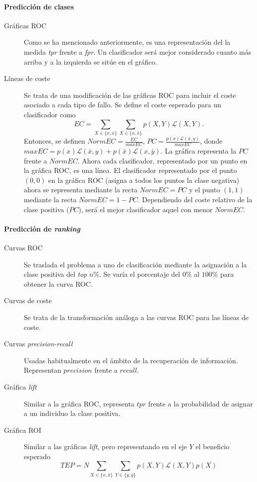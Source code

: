 \paragraph{Predicción de clases}
	\begin{description}
		\item[Gráficas ROC] Como se ha mencionado anteriormente, es una representación del la medida \textit{tpr} frente a \textit{fpr}. Un clasificador será mejor considerado cuanto más arriba y a la izquierda se sitúe en el gráfico. 
		\item[Líneas de coste] Se trata de una modificación de las gráficas ROC para incluir el coste asociado a cada tipo de fallo. Se define el coste esperado para un clasificador como 
		\[ EC = \sum\limits_{X \in \{x, \bar{x}\}} 
		 		\sum\limits_{X \in \{x, \bar{x}\}} 
		 			p(X,Y) \mathcal{L}(X,Y)			.\]
	Entonces, se definen $NormEC = \frac{EC}{maxEC}$, $PC = \frac{p(x) \mathcal{L}(\bar{x},y)}{maxEC}$, donde $maxEC = p(x)\mathcal{L}(\bar{x},y)+p(\bar{x})\mathcal{L}(x,\bar{y})$.  La gráfica representa la $PC$ frente a $NormEC$. Ahora cada clasificador, representado por un punto en la gráfica ROC, es una línea. El clasificador representado por el punto $(0,0)$ en la gráfica ROC (asigna a todos los puntos la clase negativa) ahora se representa mediante la recta $NormEC=PC$ y el punto $(1,1)$ mediante la recta $NormEC= 1-PC$. Dependiendo del coste relativo de la clase positiva ($PC$), será el mejor clasificador aquel con menor $NormEC$.
	\end{description}

\paragraph{Predicción de \textit{ranking}} 	
	\begin{description}
		\item[Curvas ROC] Se traslada el problema a uno de clasificación mediante la asignación a la clase positiva del \textit{top} $n\%$. Se varía el porcentaje del $0\%$ al $100\%$ para obtener la curva ROC.
		\item[Curvas de coste] Se trata de la transformación análoga a las curvas ROC para las líneas de coste.
		\item[Curvas \textit{precision-recall}] Usadas habitualmente en el ámbito de la recuperación de información. Representan $precision$ frente a $recall$.
		\item[Gráfica \textit{lift}] Similar a la gráfica ROC, representa $tpr$ frente a la probabilidad de asignar a un individuo la clase positiva. 
		\item[Gráfica ROI] Similar a las gráficas \textit{lift}, pero representando en el eje $Y$ el beneficio esperado 
		\[	TEP = N \sum\limits_{X \in \{x,\bar{x}\}}
					\sum\limits_{Y \in \{y,\bar{y}\}}
						p(X,Y) \mathcal{L}(X,Y) p(X) \]
	\end{description}

